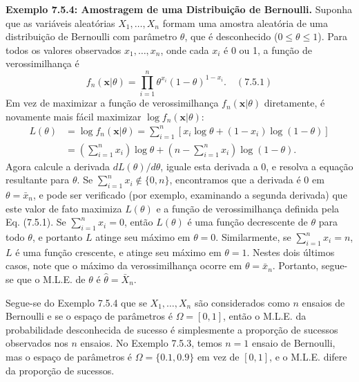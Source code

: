 \vspace{\baselineskip}

\textbf{Exemplo 7.5.4: Amostragem de uma Distribuição de Bernoulli.} Suponha que as variáveis aleatórias $X_1, \dots, X_n$ formam uma amostra aleatória de uma distribuição de Bernoulli com parâmetro $\theta$, que é desconhecido ($0 \le \theta \le 1$). Para todos os valores observados $x_1, \dots, x_n$, onde cada $x_i$ é 0 ou 1, a função de verossimilhança é
$$f_n(\textbf{x}|\theta) = \prod_{i=1}^{n} \theta^{x_i}(1-\theta)^{1-x_i}. \quad (7.5.1)$$
Em vez de maximizar a função de verossimilhança $f_n(\textbf{x}|\theta)$ diretamente, é novamente mais fácil maximizar $\log f_n(\textbf{x}|\theta)$:
\begin{align*}
L(\theta) &= \log f_n(\textbf{x}|\theta) = \sum_{i=1}^{n} [x_i \log \theta + (1-x_i) \log(1-\theta)] \\
&= \left(\sum_{i=1}^{n} x_i \right) \log \theta + \left(n - \sum_{i=1}^{n} x_i \right) \log(1-\theta).
\end{align*}
Agora calcule a derivada $dL(\theta)/d\theta$, iguale esta derivada a 0, e resolva a equação resultante para $\theta$. Se $\sum_{i=1}^{n} x_i \notin \{0, n\}$, encontramos que a derivada é 0 em $\theta = \bar{x}_n$, e pode ser verificado (por exemplo, examinando a segunda derivada) que este valor de fato maximiza $L(\theta)$ e a função de verossimilhança definida pela Eq. (7.5.1). Se $\sum_{i=1}^{n} x_i = 0$, então $L(\theta)$ é uma função decrescente de $\theta$ para todo $\theta$, e portanto $L$ atinge seu máximo em $\theta=0$. Similarmente, se $\sum_{i=1}^{n} x_i = n$, $L$ é uma função crescente, e atinge seu máximo em $\theta=1$. Nestes dois últimos casos, note que o máximo da verossimilhança ocorre em $\theta = \bar{x}_n$. Portanto, segue-se que o M.L.E. de $\theta$ é $\hat{\theta} = \bar{X}_n$.

\vspace{\baselineskip}

Segue-se do Exemplo 7.5.4 que se $X_1, \dots, X_n$ são considerados como $n$ ensaios de Bernoulli e se o espaço de parâmetros é $\Omega = [0, 1]$, então o M.L.E. da probabilidade desconhecida de sucesso é simplesmente a proporção de sucessos observados nos $n$ ensaios. No Exemplo 7.5.3, temos $n=1$ ensaio de Bernoulli, mas o espaço de parâmetros é $\Omega=\{0.1, 0.9\}$ em vez de $[0, 1]$, e o M.L.E. difere da proporção de sucessos.

\vspace{\baselineskip}

